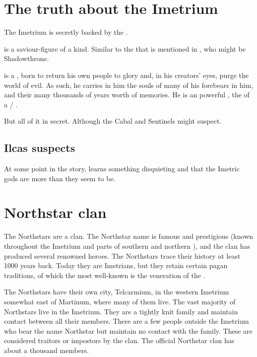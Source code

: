 \section{The truth about the Imetrium}
The Imetrium is secretly backed by the \nagae. 

\Sarokash is a saviour-figure of a kind. 
Similar to the \human{}  that is mentioned in \cite{StevenErikson:TheBonehunters}, who might be Shadowthrone. 

\Sarokash is a , born to return his own people to glory and, in his creators' eyes, purge the world of evil. 
As such, he carries in him the souls of many of his forebears in him, and their many thousands of years worth of memories. 
He is an powerful \vertex, the \apex{} of a \cuezcan/\naga{} \matrixx. 

But all of it in secret. 
Although the Cabal and Sentinels might suspect.





\subsection{Ilcas suspects}
At some point in the story,  learns something disquieting and  that the Imetric gods are more than they seem to be. 









\section{Northstar clan}
The Northstars are a \scathaese{} clan. 
The Northstar name is famous and prestigious (known throughout the Imetrium and parts of southern \Velcad{} and northern \Durcac), and the clan has produced several renowned heroes. 
The Northstars trace their history at least 1000 years back. 
Today they are Imetrians, but they retain certain pagan traditions, of which the most well-known is the veneration of the . 

The Northstars have their own city, Telcarmium, in the western Imetrium somewhat east of Martinum, where many of them live. The vast majority of Northstars live in the Imetrium. 
They are a tightly knit family and maintain contact between all their members. 
There are a few people outside the Imetrium who bear the name Northstar but maintain no contact with the family. 
These are considered traitors or impostors by the clan. 
The official Northstar clan has about a thousand members. 

